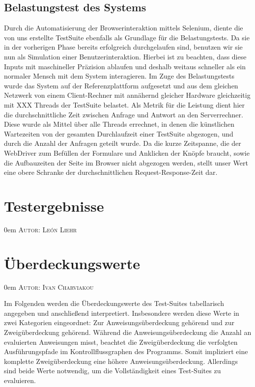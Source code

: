 \documentclass{article}
\makeatletter
\newcommand{\sectionauthor}[1]{
	{\parindent 0em \large \scshape Autor: #1 \par \nobreak \vspace*{1em}}
	\@afterheading
}
\makeatother
\begin{document}
\subsection{Belastungstest des Systems}
Durch die Automatisierung der Browserinteraktion mittels Selenium, diente die von uns erstellte TestSuite ebenfalls als Grundlage für die Belastungstests. Da sie in der vorherigen Phase bereits erfolgreich durchgelaufen sind, benutzen wir sie nun als Simulation einer Benutzerinteraktion. Hierbei ist zu beachten, dass diese Inputs mit maschineller Präzision ablaufen und deshalb weitaus schneller als ein normaler Mensch mit dem System interagieren. Im Zuge des Belastungstests wurde das System auf der Referenzplattform aufgesetzt und aus dem gleichen Netzwerk von einem Client-Rechner mit annähernd gleicher Hardware gleichzeitig mit XXX Threads der TestSuite belastet. Als Metrik für die Leistung dient hier die durchschnittliche Zeit zwischen Anfrage und Antwort an den Serverrechner. Diese wurde als Mittel über alle Threads errechnet, in denen die künstlichen Wartezeiten von der gesamten Durchlaufzeit einer TestSuite abgezogen, und durch die Anzahl der Anfragen geteilt wurde. Da die kurze Zeitspanne, die der WebDriver zum Befüllen der Formulare und Anklicken der Knöpfe braucht, sowie die Aufbauzeiten der Seite im Browser nicht abgezogen werden, stellt unser Wert eine obere Schranke der durchschnittlichen Request-Response-Zeit dar.

\newpage

\section{Testergebnisse}
\sectionauthor{León Liehr}



\newpage

\section{Überdeckungswerte}
\sectionauthor{Ivan Charviakou}

Im Folgenden werden die Überdeckungswerte des Test-Suites tabellarisch angegeben und anschließend interpretiert. 
Insbesondere werden diese Werte in zwei Kategorien eingeordnet: Zur Anweisungsüberdeckung gehörend und zur Zweigüberdeckung gehörend. 
Während die Anweisungsüberdeckung die Anzahl an evaluierten Anweisungen misst, beachtet die Zweigüberdeckung die verfolgten Ausführungspfade im Kontrollflussgraphen des Programms.
Somit impliziert eine komplette Zweigüberdeckung eine höhere Anweisungsüberdeckung. 
Allerdings sind beide Werte notwendig, um die Vollständigkeit eines Test-Suites zu evaluieren.
\end{document}
